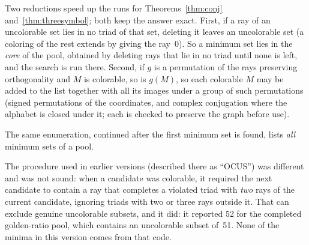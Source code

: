 Two reductions speed up the runs for Theorems~\ref{thm:conj} and~\ref{thm:threesymbol}; both
keep the answer exact.  First, if a ray of an uncolorable set lies in no triad of that set,
deleting it leaves an uncolorable set (a coloring of the rest extends by giving the ray~0).  So a
minimum set lies in the \emph{core} of the pool, obtained by deleting rays that lie in no triad
until none is left, and the search is run there.  Second, if
$g$ is a permutation of the rays preserving orthogonality and $M$ is colorable, so is $g(M)$, so
each colorable $M$ may be added to the list together with all its images under a group of such
permutations (signed permutations of the coordinates, and complex conjugation where the alphabet
is closed under it; each is checked to preserve the graph before use).

The same enumeration, continued after the first
minimum set is found, lists \emph{all} minimum sets of a pool.

The procedure used in earlier versions (described there as ``OCUS'') was different and was not
sound: when a candidate was colorable, it required the next candidate to contain a ray that
completes a violated triad with \emph{two} rays of the current candidate, ignoring triads with
two or three rays outside it.  That can exclude genuine uncolorable subsets, and it did: it
reported 52 for the completed golden-ratio pool, which contains an uncolorable subset of~51.
None of the minima in this version comes from that code.
